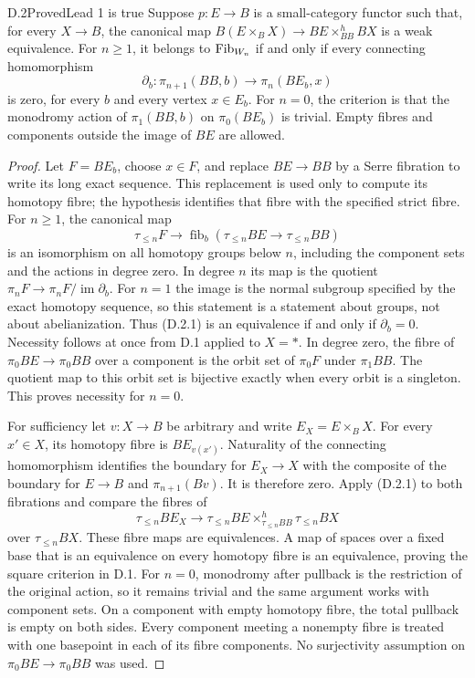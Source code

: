 \begin{claim}{D.2}{Proved}{Lead 1 is true}
Suppose $p:E\to B$ is a small-category functor such that, for every $X\to B$, the canonical map $B(E\times_BX)\to BE\times^h_{BB}BX$ is a weak equivalence. For $n\geq1$, it belongs to $\mathrm{Fib}_{W_n}$ if and only if every connecting homomorphism
\[
\partial_b:\pi_{n+1}(BB,b)\longrightarrow\pi_n(BE_b,x)
\]
is zero, for every $b$ and every vertex $x\in E_b$. For $n=0$, the criterion is that the monodromy action of $\pi_1(BB,b)$ on $\pi_0(BE_b)$ is trivial. Empty fibres and components outside the image of $BE$ are allowed.
\end{claim}
\begin{proof}
Let $F=BE_b$, choose $x\in F$, and replace $BE\to BB$ by a Serre fibration to write its long exact sequence. This replacement is used only to compute its homotopy fibre; the hypothesis identifies that fibre with the specified strict fibre. For $n\geq1$, the canonical map
\[
\tau_{\leq n}F\longrightarrow
\operatorname{fib}_b(\tau_{\leq n}BE\to\tau_{\leq n}BB)
\tag{D.2.1}
\]
is an isomorphism on all homotopy groups below $n$, including the component sets and the actions in degree zero. In degree $n$ its map is the quotient
$\pi_nF\to\pi_nF/\operatorname{im}\partial_b$.
For $n=1$ the image is the normal subgroup specified by the exact homotopy sequence, so this statement is a statement about groups, not about abelianization. Thus (D.2.1) is an equivalence if and only if $\partial_b=0$. Necessity follows at once from D.1 applied to $X=*$. In degree zero, the fibre of $\pi_0BE\to\pi_0BB$ over a component is the orbit set of $\pi_0F$ under $\pi_1BB$. The quotient map to this orbit set is bijective exactly when every orbit is a singleton. This proves necessity for $n=0$.

For sufficiency let $v:X\to B$ be arbitrary and write $E_X=E\times_BX$. For every $x'\in X$, its homotopy fibre is $BE_{v(x')}$. Naturality of the connecting homomorphism identifies the boundary for $E_X\to X$ with the composite of the boundary for $E\to B$ and $\pi_{n+1}(Bv)$. It is therefore zero. Apply (D.2.1) to both fibrations and compare the fibres of
\[
\tau_{\leq n}BE_X\longrightarrow
\tau_{\leq n}BE\times^h_{\tau_{\leq n}BB}\tau_{\leq n}BX
\]
over $\tau_{\leq n}BX$. These fibre maps are equivalences. A map of spaces over a fixed base that is an equivalence on every homotopy fibre is an equivalence, proving the square criterion in D.1. For $n=0$, monodromy after pullback is the restriction of the original action, so it remains trivial and the same argument works with component sets. On a component with empty homotopy fibre, the total pullback is empty on both sides. Every component meeting a nonempty fibre is treated with one basepoint in each of its fibre components. No surjectivity assumption on $\pi_0BE\to\pi_0BB$ was used.
\end{proof}

